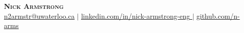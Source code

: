 \documentclass[letterpaper,9.5pt]{article}
\begin{document}

\begin{center}
    \textbf{\Huge \scshape Nick Armstrong} \\ \vspace{1pt}
    \href{mailto:n2armstr@uwaterloo.ca}{\underline{n2armstr@uwaterloo.ca}} $|$ 
    \href{https://www.linkedin.com/in/nick-armstrong-eng}{\underline{{linkedin.com/in/nick-armstrong-eng} }} $|$
    \href{https://github.com/n-arms}{\underline{github.com/n-arms}}
    \vspace*{-6pt} %
\end{center}

\end{document}
